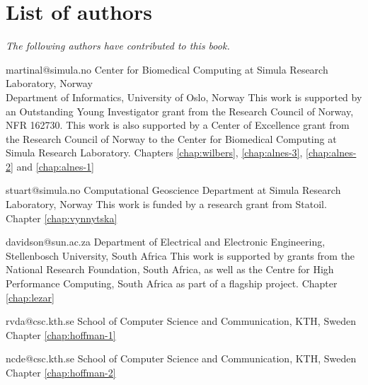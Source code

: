 \chapter*{List of authors}
\addtocounter{chapter}{1}
\vspace{-1cm}

\emph{The following authors have contributed to this book.}

\vspace{1cm}

             {martinal@simula.no}
             {Center for Biomedical Computing at Simula Research Laboratory, Norway \\
              Department of Informatics, University of Oslo, Norway}
             {This work is supported by an Outstanding Young
              Investigator grant from the Research Council of Norway,
              NFR 162730.
              This work is also supported by a Center of Excellence grant
              from the Research Council of Norway to the Center for
              Biomedical Computing at Simula Research Laboratory.}
             {Chapters
              \ref{chap:wilbers},
              \ref{chap:alnes-3},
              \ref{chap:alnes-2} and
              \ref{chap:alnes-1}}

             {stuart@simula.no}
             {Computational Geoscience Department at Simula Research Laboratory, Norway}
             {This work is funded by a research grant from Statoil.}
             {Chapter \ref{chap:vynnytska}}

             {davidson@sun.ac.za}
             {Department of Electrical and Electronic Engineering, Stellenbosch University, South Africa}
             {This work is supported by grants from the National Research
              Foundation, South Africa, as well as the Centre for High Performance
              Computing, South Africa as part of a flagship project.}
             {Chapter \ref{chap:lezar}}

             {rvda@csc.kth.se}
             {School of Computer Science and Communication, KTH, Sweden}
             {}
             {Chapter \ref{chap:hoffman-1}}

             {ncde@csc.kth.se}
             {School of Computer Science and Communication, KTH, Sweden}
             {}
             {Chapter \ref{chap:hoffman-2}}

